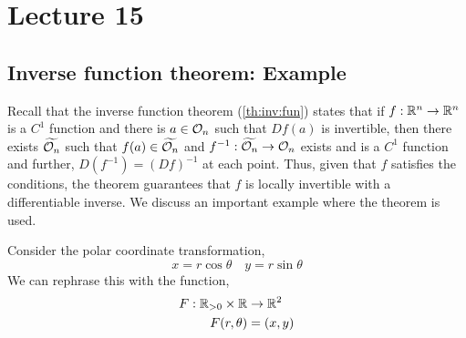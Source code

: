 \documentclass[../Analysis-3.tex]{subfiles}
\begin{document}
\chapter*{Lecture 15} %
\setcounter{chapter}{15} %
\setcounter{section}{0}

\section{Inverse function theorem: Example}

Recall that the inverse function theorem (\ref{th:inv:fun}) states that if \( f: \mathbb{R}^n \to \mathbb{R}^n  \) is a \( C^1 \) function and there is \( a \in \mathcal{O}_{n} \) such that \( Df(a) \) is invertible, then there exists \( \widetilde{\mathcal{O}_{n}} \) such that \( f(a) \in \widetilde{\mathcal{O}_{n}} \) and \( f^{-1}: \widetilde{\mathcal{O}_{n}} \to \mathcal{O}_{n} \) exists and is a \( C^1 \) function and further, \( D(f^{-1}) = (Df)^{-1} \) at each point. Thus, given that \( f \) satisfies the conditions, the theorem guarantees that \( f \) is locally invertible with a differentiable inverse. We discuss an important example where the theorem is used.
\smallskip

Consider the polar coordinate transformation,
\[
  x = r \cos \theta \quad y = r \sin \theta
\]
We can rephrase this with the function,
\begin{align*}
  F: \mathbb{R}_{> 0} \times \mathbb{R} & \to \mathbb{R}^2 \\
  F(r, \theta)                    & = (x,y)
\end{align*}
\end{document}
